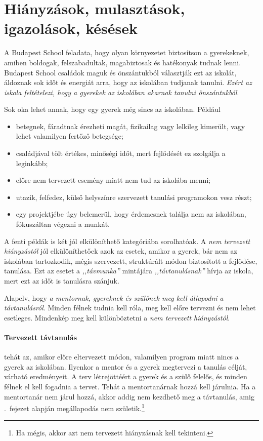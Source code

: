 \section{Hiányzások, mulasztások, igazolások, késések}

A Budapest School feladata, hogy olyan környezetet biztosítson a gyerekeknek, amiben boldogak, felszabadultak, magabiztosak és hatékonyak tudnak lenni. Budapest School családok maguk és önszántukból választják ezt az iskolát, áldoznak sok időt és energiát arra, hogy az iskolában tudjanak tanulni. \emph{Ezért az iskola feltételezi, hogy a gyerekek az iskolában akarnak tanulni önszántukból}.

Sok oka lehet annak, hogy egy gyerek még sincs az iskolában. Például
\begin{itemize}
    \item betegnek, fáradtnak érezheti magát, fizikailag vagy lelkileg kimerült, vagy lehet valamilyen fertőző betegsége;
    \item családjával tölt értékes, minőségi időt, mert fejlődését ez szolgálja a leginkább;
    \item előre nem tervezett esemény miatt nem tud az iskolába menni;
    \item utazik, felfedez, külső helyszínre szervezett tanulási programokon vesz részt;
    \item egy projektjébe úgy belemerül, hogy érdemesnek találja nem az iskolában, fóku\-száltan végezni a munkát.
 \end{itemize}

A fenti példák is két jól elkülöníthető kategóriába sorolhatóak. A \emph{nem tervezett hiányzástól} jól elkülöníthetőek azok az esetek, amikor a gyerek, bár nem az iskolában tartozkodik, mégis szervezett, struktúrált módon biztosított a fejlődése, tanulása. Ezt az esetet a \emph{,,távmunka''} mintájára \emph{,,távtanulásnak''} hívja az iskola, mert ezt az időt is tanulásra szánjuk.

Alapelv, hogy \emph{a mentornak, gyereknek és szülőnek meg kell állapodni a távtanulásról}. Minden félnek tudnia kell róla, meg kell előre tervezni és nem lehet esetleges. Mindenkép meg kell különböztetni a \emph{nem tervezett hiányzástól}.

\paragraph{Tervezett távtanulás} tehát az, amikor előre eltervezett módon, valamilyen program miatt nincs a gyerek az iskolában. Ilyenkor a mentor és a gyerek megtervezi a tanulás célját, várható eredményeit. A terv létrejöttéért a gyerek és a szülő felelős, és minden félnek el kell fogadnia a tervet. Tehát a mentortanárnak hozzá kell járulnia. Ha a mentortanár nem járul hozzá, akkor addig nem kezdhető meg a távtanulás, amig .~fejezet alapján megállapodás nem születik.\footnote{Ha mégis, akkor azt nem tervezett hiányzásnak kell tekinteni.}

